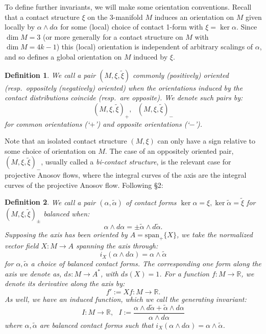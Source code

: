 \documentclass[10pt]{amsart}
\newcommand{\R}{\mathbb{R}}
\theoremstyle{definition}
\newtheorem{dfn}{Definition}
\begin{document}
To define further invariants, we will make some orientation conventions. Recall that a contact structure $\xi$ on the 3-manifold $M$ induces an orientation on $M$ given locally by $\alpha\wedge d\alpha$ for some (local) choice of contact 1-form with $\xi = \ker\alpha$. Since $\dim M = 3$ (or more generally for a contact structure on $M$ with $\dim M = 4k-1$) this (local) orientation is independent of arbitrary scalings of $\alpha$, and so defines a global orientation on $M$ induced by $\xi$.
\begin{dfn}
   {\em  We call a pair $(M, \xi, \tilde\xi)$ {\em commonly (positively) oriented} (resp.~{\em oppositely (negatively) oriented}) when the orientations induced by the contact distributions coincide (resp.~are opposite). We denote such pairs by:
\[ (M, \xi, \tilde \xi)_+, ~~~(M, \xi, \tilde \xi)_-\]
for common orientations (`$+$') and opposite orientations (`$-$').}
\end{dfn}
Note that an isolated contact structure $(M,\xi)$ can only have a sign relative to some choice of orientation on $M$.
The case of an oppositely oriented pair, $(M, \xi, \tilde\xi)_-$, usually called a {\em bi-contact structure}, is the relevant case for projective Anosov flows, where the integral curves of the axis are the integral curves of the projective Anosov flow. Following \cite{Mass} \S 2:

\begin{dfn}\label{def:BalGenInv}
{\em We call a pair $(\alpha, \tilde\alpha)$ of contact forms $\ker \alpha = \xi, \ker\tilde\alpha = \tilde \xi$ for $(M, \xi, \tilde \xi)_\pm$ {\em balanced} when:
    \[ \alpha\wedge d\alpha = \pm \tilde\alpha\wedge d\tilde\alpha. \]
    Supposing the axis has been oriented by $A = \text{span}_+\{ X\}$, we take the {\em normalized vector field} $X:M\to A$ spanning the axis through:
    \[ i_X(\alpha\wedge d\alpha) = \alpha\wedge\tilde\alpha \]
    for $\alpha, \tilde\alpha$ a choice of balanced contact forms. The corresponding one form along the axis we denote as, $ds : M\to A^*$,
    with $ds(X) = 1$. For a function $f:M\to \R$, we denote its {\em derivative along the axis} by:
    \[ f' := Xf :M\to \R.\]
    As well, we have an induced function, which we call the  {\em generating invariant}:
    \[ I:M\to \R, ~~~I := \frac{\alpha\wedge d\tilde\alpha + \tilde\alpha \wedge d\alpha}{\alpha\wedge d\alpha} \]
    where $\alpha, \tilde\alpha$ are balanced contact forms such that $i_X(\alpha\wedge d\alpha) = \alpha\wedge\tilde\alpha$.}
\end{dfn}
\end{document}
